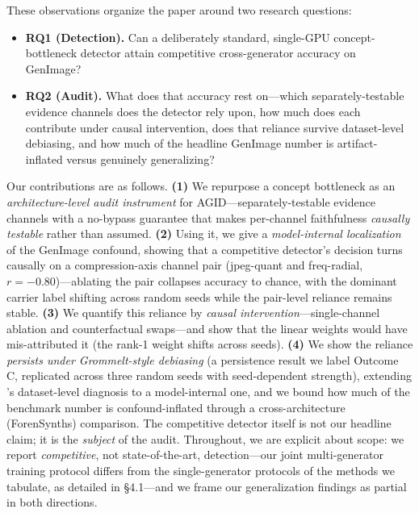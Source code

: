 These observations organize the paper around two research questions:

\begin{itemize}
\tightlist
\item
  \textbf{RQ1 (Detection).} Can a deliberately standard, single-GPU concept-bottleneck detector attain competitive cross-generator accuracy on GenImage?
\item
  \textbf{RQ2 (Audit).} What does that accuracy rest on---which separately-testable evidence channels does the detector rely upon, how much does each contribute under causal intervention, does that reliance survive dataset-level debiasing, and how much of the headline GenImage number is artifact-inflated versus genuinely generalizing?
\end{itemize}

Our contributions are as follows. \textbf{(1)} We repurpose a concept bottleneck as an \emph{architecture-level audit instrument} for AGID---separately-testable evidence channels with a no-bypass guarantee that makes per-channel faithfulness \emph{causally testable} rather than assumed. \textbf{(2)} Using it, we give a \emph{model-internal localization} of the GenImage confound, showing that a competitive detector's decision turns causally on a compression-axis channel pair (jpeg-quant and freq-radial, $r{=}{-}0.80$)---ablating the pair collapses accuracy to chance, with the dominant carrier label shifting across random seeds while the pair-level reliance remains stable. \textbf{(3)} We quantify this reliance by \emph{causal intervention}---single-channel ablation and counterfactual swaps---and show that the linear weights would have mis-attributed it (the rank-1 weight shifts across seeds). \textbf{(4)} We show the reliance \emph{persists under Grommelt-style debiasing} (a persistence result we label Outcome C, replicated across three random seeds with seed-dependent strength), extending \citet{grommelt2024fakejpeg}'s dataset-level diagnosis to a model-internal one, and we bound how much of the benchmark number is confound-inflated through a cross-architecture (ForenSynths) comparison. The competitive detector itself is not our headline claim; it is the \emph{subject} of the audit. Throughout, we are explicit about scope: we report \emph{competitive}, not state-of-the-art, detection---our joint multi-generator training protocol differs from the single-generator protocols of the methods we tabulate, as detailed in \S{}4.1---and we frame our generalization findings as partial in both directions.

